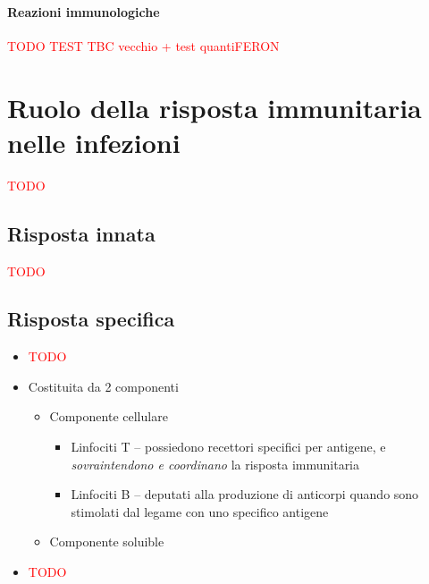 \documentclass[italian,]{article}
\providecommand{\tightlist}{%
  \setlength{\itemsep}{0pt}\setlength{\parskip}{0pt}}
\newcommand{\TODO}[1]{\textcolor{red}{\textsf{\footnotesize{TODO #1}}}} %
\begin{document}
\hypertarget{reazioni-immunologiche}{%
\paragraph{Reazioni immunologiche}\label{reazioni-immunologiche}}

\TODO{TEST TBC vecchio + test quantiFERON}

\hypertarget{ruolo-della-risposta-immunitaria-nelle-infezioni}{%
\section{Ruolo della risposta immunitaria nelle
infezioni}\label{ruolo-della-risposta-immunitaria-nelle-infezioni}}

\TODO{}

\hypertarget{risposta-innata}{%
\subsection{Risposta innata}\label{risposta-innata}}

\TODO{}

\hypertarget{risposta-specifica}{%
\subsection{Risposta specifica}\label{risposta-specifica}}

\begin{itemize}
\item
  \TODO{}
\item
  Costituita da 2 componenti

  \begin{itemize}
  \tightlist
  \item
    Componente cellulare

    \begin{itemize}
    \tightlist
    \item
      Linfociti T -- possiedono recettori specifici per antigene, e
      \emph{sovraintendono e coordinano} la risposta immunitaria
    \item
      Linfociti B -- deputati alla produzione di anticorpi quando sono
      stimolati dal legame con uno specifico antigene
    \end{itemize}
  \item
    Componente soluible
  \end{itemize}
\item
  \TODO{}
\end{itemize}
\end{document}
